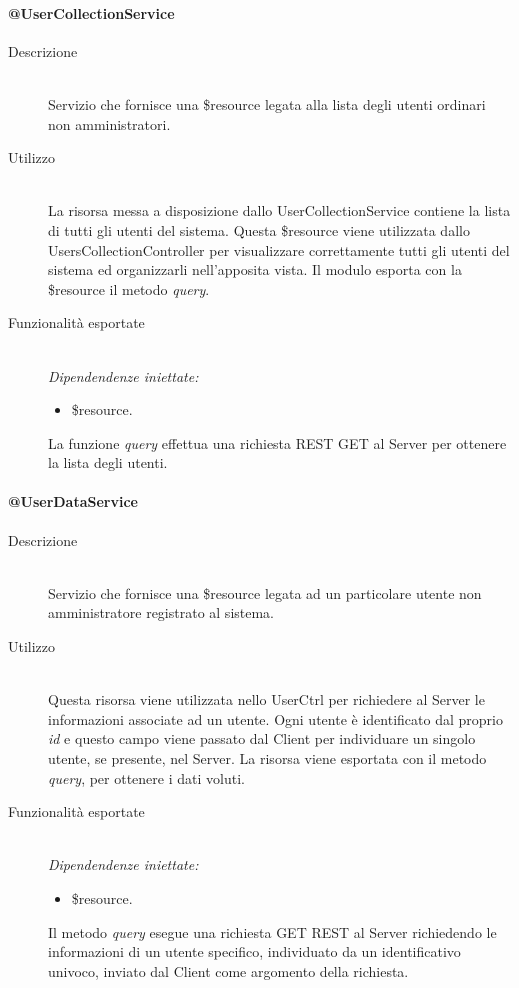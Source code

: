 \paragraph{@UserCollectionService}
\begin{description}
 \item[Descrizione] \hfill \\
 Servizio che fornisce una \$resource legata alla lista degli utenti ordinari non amministratori.  
 \item[Utilizzo] \hfill \\
 La risorsa messa a disposizione dallo UserCollectionService contiene la lista di tutti gli utenti 
 del sistema. Questa \$resource viene utilizzata dallo UsersCollectionController per visualizzare 
 correttamente tutti gli utenti del sistema ed organizzarli nell'apposita vista. Il modulo esporta 
 con la \$resource il metodo \textit{query}. 
 \item[Funzionalità esportate] \hfill \\
 \emph{Dipendendenze iniettate:}
 \begin{itemize}
  \item \$resource.
 \end{itemize}
 La funzione \textit{query} effettua una richiesta REST GET al Server per ottenere la lista degli 
 utenti.
\end{description}

\paragraph{@UserDataService}
\begin{description}
 \item[Descrizione] \hfill \\
 Servizio che fornisce una \$resource legata ad un particolare utente non amministratore registrato al sistema.
 \item[Utilizzo] \hfill \\
 Questa risorsa viene utilizzata nello UserCtrl per richiedere al Server le informazioni associate ad un utente. Ogni utente è identificato dal proprio \textit{id} e questo campo viene passato dal Client per individuare un singolo utente, se presente, nel Server. La risorsa viene esportata 
con il metodo \textit{query}, per ottenere i dati voluti.
 \item[Funzionalità esportate] \hfill \\
 \emph{Dipendendenze iniettate:}
 \begin{itemize}
  \item \$resource.
 \end{itemize}
 Il metodo \textit{query} esegue una richiesta GET REST al Server richiedendo le informazioni di un utente specifico, individuato da un identificativo univoco, inviato dal Client come argomento della richiesta.
\end{description}

